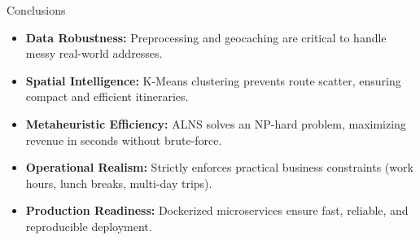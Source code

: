 \begin{frame}{Conclusions}
\vspace{0.3cm}
\normalsize
\begin{itemize}
    \setlength\itemsep{0.28cm}
    \item \textbf{Data Robustness:} Preprocessing and geocaching are critical to handle messy real-world addresses.
    \item \textbf{Spatial Intelligence:} K-Means clustering prevents route scatter, ensuring compact and efficient itineraries.
    \item \textbf{Metaheuristic Efficiency:} ALNS solves an NP-hard problem, maximizing revenue in seconds without brute-force.
    \item \textbf{Operational Realism:} Strictly enforces practical business constraints (work hours, lunch breaks, multi-day trips).
    \item \textbf{Production Readiness:} Dockerized microservices ensure fast, reliable, and reproducible deployment.
\end{itemize}
\end{frame}

